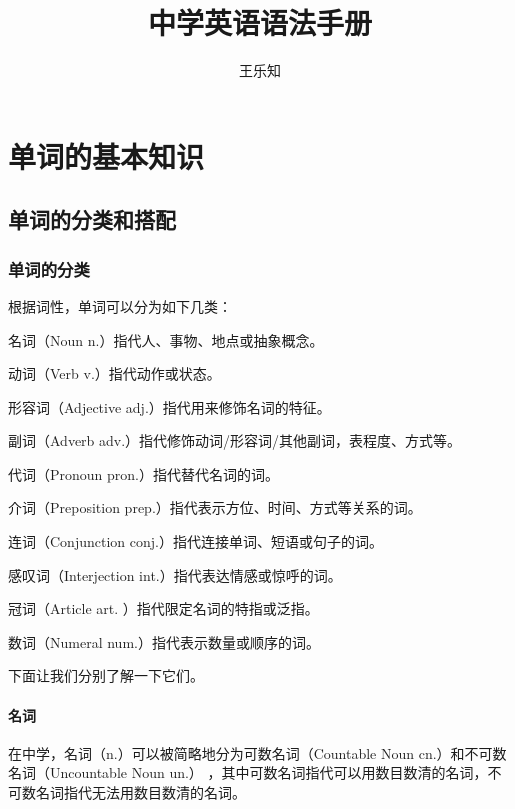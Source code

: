 \documentclass[UTF8]{ctexbook}
\title{中学英语语法手册}
\author{王乐知\and徐晨曦}
\begin{document}
\maketitle

\begin{center}

{}

\end{center}

\tableofcontents

\part{单词的基本知识}

\chapter{单词的分类和搭配}

\section{单词的分类}

根据词性，单词可以分为如下几类：

名词（Noun n.）指代人、事物、地点或抽象概念。

动词（Verb v.）指代动作或状态。

形容词（Adjective adj.）指代用来修饰名词的特征。

副词（Adverb adv.）指代修饰动词/形容词/其他副词，表程度、方式等。

代词（Pronoun pron.）指代替代名词的词。

介词（Preposition prep.）指代表示方位、时间、方式等关系的词。

连词（Conjunction conj.）指代连接单词、短语或句子的词。

感叹词（Interjection int.）指代表达情感或惊呼的词。

冠词（Article art. ）指代限定名词的特指或泛指。

数词（Numeral num.）指代表示数量或顺序的词。

下面让我们分别了解一下它们。

\subsection{名词}

在中学，名词（n.）可以被简略地分为可数名词（Countable Noun cn.）和不可数名词（Uncountable Noun un.）
，其中可数名词指代可以用数目数清的名词，不可数名词指代无法用数目数清的名词。
\end{document}
